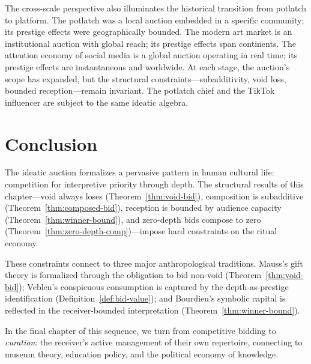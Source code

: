 The cross-scale perspective also illuminates the historical transition
from potlatch to platform.  The potlatch was a local auction embedded
in a specific community; its prestige effects were geographically
bounded.  The modern art market is an institutional auction with global
reach; its prestige effects span continents.  The attention economy of
social media is a global auction operating in real time; its prestige
effects are instantaneous and worldwide.  At each stage, the auction's
scope has expanded, but the structural constraints---subadditivity,
void loss, bounded reception---remain invariant.  The potlatch chief
and the TikTok influencer are subject to the same ideatic algebra.

\section{Conclusion}
\label{sec:ch14-conclusion}

The ideatic auction formalizes a pervasive pattern in human cultural
life: competition for interpretive priority through depth.  The
structural results of this chapter---void always loses
(Theorem~\ref{thm:void-bid}), composition is subadditive
(Theorem~\ref{thm:composed-bid}), reception is bounded by audience
capacity (Theorem~\ref{thm:winner-bound}), and zero-depth bids compose to
zero (Theorem~\ref{thm:zero-depth-comp})---impose hard constraints on
the ritual economy.

These constraints connect to three major anthropological traditions.
Mauss's gift theory is formalized through the obligation to bid non-void
(Theorem~\ref{thm:void-bid}); Veblen's conspicuous consumption is
captured by the depth-as-prestige identification
(Definition~\ref{def:bid-value}); and Bourdieu's symbolic capital is
reflected in the receiver-bounded interpretation
(Theorem~\ref{thm:winner-bound}).

In the final chapter of this sequence, we turn from competitive bidding
to \emph{curation}: the receiver's active management of their own
repertoire, connecting to museum theory, education policy, and the
political economy of knowledge.

